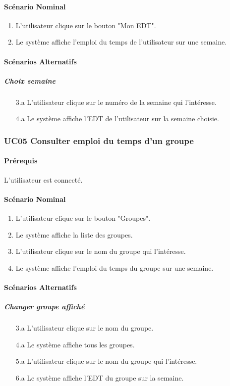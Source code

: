 \documentclass[a4paper,12pt]{article}
\begin{document}
\paragraph{Scénario Nominal}
\begin{enumerate}
    \item L'utilisateur clique sur le bouton "Mon EDT".
    \item Le système affiche l'emploi du temps de l'utilisateur sur une semaine.
\end{enumerate}

\paragraph{Scénarios Alternatifs}
\subparagraph{Choix semaine}
\begin{enumerate}
    \item[3.a] L'utilisateur clique sur le numéro de la semaine qui l'intéresse.
    \item[4.a] Le système affiche l'EDT de l'utilisateur sur la semaine choisie.
\end{enumerate}

\subsubsection{UC05 Consulter emploi du temps d'un groupe}
\paragraph{Prérequis} L'utilisateur est connecté.

\paragraph{Scénario Nominal}
\begin{enumerate}
    \item L'utilisateur clique sur le bouton "Groupes".
    \item Le système affiche la liste des groupes.
    \item L'utilisateur clique sur le nom du groupe qui l'intéresse.
    \item Le système affiche l'emploi du temps du groupe sur une semaine.
\end{enumerate}

\paragraph{Scénarios Alternatifs}
\subparagraph{Changer groupe affiché}
\begin{enumerate}
    \item[3.a] L'utilisateur clique sur le nom du groupe.
    \item[4.a] Le système affiche tous les groupes.
    \item[5.a] L'utilisateur clique sur le nom du groupe qui l'intéresse.
    \item[6.a] Le système affiche l'EDT du groupe sur la semaine.
\end{enumerate}
\end{document}
